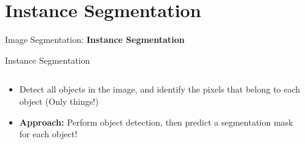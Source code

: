 \section{Instance Segmentation}
\begin{frame}{}
    \LARGE Image Segmentation: \textbf{Instance Segmentation}
\end{frame}

\begin{frame}{Instance Segmentation}
    \begin{columns}
    \begin{column}{0.5\textwidth}
        \begin{itemize}
            \item<1-> Detect all objects in the image, and identify the pixels that belong to each object (Only things!)
            \item<2-> \textbf{Approach:} Perform object detection, then predict a segmentation mask for each object!
        \end{itemize}
    \end{column}
    \begin{column}{0.5\textwidth}
    \end{column}
\end{columns}
\end{frame}

